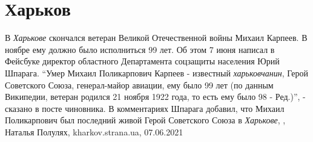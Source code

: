  
 
 
 
 
\chapter{Харьков}

В \emph{Харькове} скончался ветеран Великой Отечественной войны Михаил Карпеев. В
ноябре ему должно было исполниться 99 лет. Об этом 7 июня написал в Фейсбуке
директор областного Департамента соцзащиты населения Юрий Шпарага.  \enquote{Умер
Михаил Поликарпович Карпеев - известный \emph{харьковчанин}, Герой Советского Союза,
генерал-майор авиации, ему было 99 лет (по данным Википедии, ветеран родился 21
ноября 1922 года, то есть ему было 98 - Ред.)}, - сказано в посте чиновника.  В
комментариях Шпарага добавил, что Михаил Поликарпович был последний живой Герой
Советского Союза в \emph{Харькове},
, Наталья Полулях, kharkov.strana.ua, 07.06.2021

